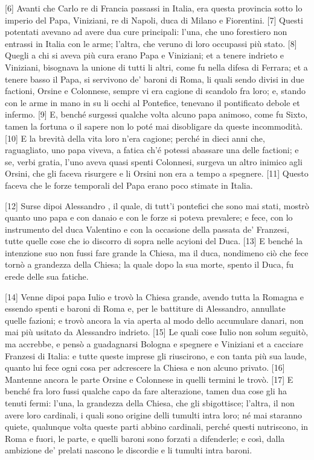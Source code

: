 \quebra

{[}6{]} Avanti che Carlo re di Francia passassi in Italia, era questa
provincia sotto lo imperio del Papa, Viniziani, re di Napoli, duca di
Milano e Fiorentini. {[}7{]} Questi potentati avevano ad avere dua cure
principali: l'una, che uno forestiero non entrassi in Italia con le
arme; l'altra, che veruno di loro occupassi più stato. {[}8{]} Quegli a
chi si aveva più cura erano Papa e Viniziani; et a tenere indrieto e
Viniziani, bisognava la unione di tutti li altri, come fu nella difesa
di Ferrara; et a tenere basso il Papa, si servivono de' baroni di Roma,
li quali sendo divisi in due factioni, Orsine e Colonnese, sempre vi era
cagione di scandolo fra loro; e, stando con le arme in mano in su li
occhi al Pontefice, tenevano il pontificato debole et infermo. {[}9{]}
E, benché surgessi qualche volta alcuno papa animoso, come fu Sixto,
tamen la fortuna o il sapere non lo poté mai disobligare da queste
incommodità. {[}10{]} E la brevità della vita loro n'era cagione; perché
in dieci anni che, raguagliato, uno papa viveva, a fatica ch'é potessi
abassare una delle factioni; e se, verbi gratia, l'uno aveva quasi
spenti Colonnesi, surgeva un altro inimico agli Orsini, che gli faceva
risurgere e li Orsini non era a tempo a spegnere. {[}11{]} Questo faceva
che le forze temporali del Papa erano poco stimate in Italia.

{[}12{]} Surse dipoi Alessandro , il quale, di tutt'i pontefici che
sono mai stati, mostrò quanto uno papa e con danaio e con le forze si
poteva prevalere; e fece, con lo instrumento del duca Valentino e con la
occasione della passata de' Franzesi, tutte quelle cose che io discorro
di sopra nelle acyioni del Duca. {[}13{]} E benché la intenzione suo non
fussi fare grande la Chiesa, ma il duca, nondimeno ciò che fece tornò a
grandezza della Chiesa; la quale dopo la sua morte, spento il Duca, fu
erede delle sua fatiche.

{[}14{]} Venne dipoi papa Iulio e trovò la Chiesa grande, avendo tutta
la Romagna e essendo spenti e baroni di Roma e, per le battiture di
Alessandro, annullate quelle fazioni; e trovò ancora la via aperta al
modo dello accumulare danari, non mai più usitato da Alessandro
indrieto. {[}15{]} Le quali cose Iulio non solum seguitò, ma accrebbe, e
pensò a guadagnarsi Bologna e spegnere e Viniziani et a cacciare
Franzesi di Italia: e tutte queste imprese gli riuscirono, e con tanta
più sua laude, quanto lui fece ogni cosa per adcrescere la Chiesa e non
alcuno privato. {[}16{]} Mantenne ancora le parte Orsine e Colonnese in
quelli termini le trovò. {[}17{]} E benché fra loro fussi qualche capo
da fare alterazione, tamen dua cose gli ha tenuti fermi: l'una, la
grandezza della Chiesa, che gli sbigottisce; l'altra, il non avere loro
cardinali, i quali sono origine delli tumulti intra loro; né mai
staranno quiete, qualunque volta queste parti abbino cardinali, perché
questi nutriscono, in Roma e fuori, le parte, e quelli baroni sono
forzati a difenderle; e così, dalla ambizione de' prelati nascono le
discordie e li tumulti intra baroni.

